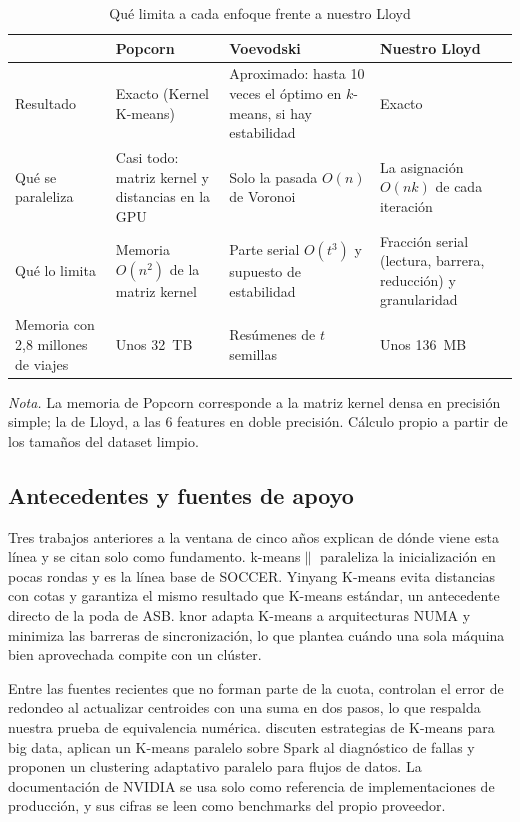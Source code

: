 \begin{table}[H]
\caption{Qué limita a cada enfoque frente a nuestro Lloyd}\label{tab:limites}
\small
\begin{tabularx}{\textwidth}{@{}L{3cm}YYY@{}}
\toprule
 & \textbf{Popcorn} & \textbf{Voevodski} & \textbf{Nuestro Lloyd} \\
\midrule
Resultado & Exacto (Kernel K-means) & Aproximado: hasta 10 veces el óptimo en $k$-means, si hay
  estabilidad & Exacto \\
\addlinespace
Qué se paraleliza & Casi todo: matriz kernel y distancias en la GPU & Solo la pasada $O(n)$ de
  Voronoi & La asignación $O(nk)$ de cada iteración \\
\addlinespace
Qué lo limita & Memoria $O(n^2)$ de la matriz kernel & Parte serial $O(t^3)$ y supuesto de
  estabilidad & Fracción serial (lectura, barrera, reducción) y granularidad \\
\addlinespace
Memoria con 2,8 millones de viajes & Unos 32~TB & Resúmenes de $t$ semillas & Unos 136~MB \\
\bottomrule
\end{tabularx}

{\footnotesize\textit{Nota.} La memoria de Popcorn corresponde a la matriz kernel densa en precisión
simple; la de Lloyd, a las 6 features en doble precisión. Cálculo propio a partir de los tamaños
del dataset limpio.\par}
\end{table}

\subsection{Antecedentes y fuentes de apoyo}\label{sec:antecedentes}

Tres trabajos anteriores a la ventana de cinco años explican de dónde viene esta línea y se citan
solo como fundamento. k-means$\|$ \parencite{bahmani2012} paraleliza la inicialización en pocas
rondas y es la línea base de SOCCER. Yinyang K-means \parencite{ding2015} evita distancias con cotas
y garantiza el mismo resultado que K-means estándar, un antecedente directo de la poda de ASB. knor
\parencite{mhembere2017} adapta K-means a arquitecturas NUMA y minimiza las barreras de
sincronización, lo que plantea cuándo una sola máquina bien aprovechada compite con un clúster.

Entre las fuentes recientes que no forman parte de la cuota, \textcite{he2022} controlan el error de
redondeo al actualizar centroides con una suma en dos pasos, lo que respalda nuestra prueba de
equivalencia numérica. \textcite{mussabayev2023} discuten estrategias de K-means para big data,
\textcite{wan2021} aplican un K-means paralelo sobre Spark al diagnóstico de fallas y
\textcite{mclaughlin2023} proponen un clustering adaptativo paralelo para flujos de datos. La
documentación de NVIDIA \parencite{nvidia2025cuml,rapids2026dask} se usa solo como referencia de
implementaciones de producción, y sus cifras se leen como benchmarks del propio proveedor.
